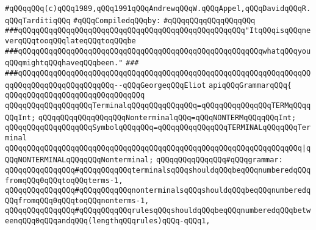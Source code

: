 \label{src/app/yacc/src/grammar.api}
\verb|#qQQqqQQq(c)qQQq1989,qQQq1991qQQqAndrewqQQqW.qQQqAppel,qQQqDavidqQQqR.qQQqTarditiqQQq|\newline
\newline
\verb|#qQQqCompiledqQQqby:|\newline
\verb|#qQQqqQQqqQQqqQQqqQQq|\newline
\newline
\newline
\newline
\verb|###qQQqqQQqqQQqqQQqqQQqqQQqqQQqqQQqqQQqqQQqqQQqqQQqqQQq"ItqQQqisqQQqneverqQQqtooqQQqlateqQQqtoqQQqbe|\newline
\verb|###qQQqqQQqqQQqqQQqqQQqqQQqqQQqqQQqqQQqqQQqqQQqqQQqqQQqqQQqwhatqQQqyouqQQqmightqQQqhaveqQQqbeen."|\newline
\verb|###|\newline
\verb|###qQQqqQQqqQQqqQQqqQQqqQQqqQQqqQQqqQQqqQQqqQQqqQQqqQQqqQQqqQQqqQQqqQQqqQQqqQQqqQQqqQQqqQQqqQQq--qQQqGeorgeqQQqEliot|\newline
\newline
\newline
\newline
\verb|apiqQQqGrammarqQQq{|\newline
\verb|qQQqqQQqqQQqqQQqqQQqqQQqqQQqqQQq|\newline
\verb|qQQqqQQqqQQqqQQqqQQqTerminalqQQqqQQqqQQqqQQq=qQQqqQQqqQQqqQQqTERMqQQqqQQqInt;|\newline
\verb|qQQqqQQqqQQqqQQqqQQqNonterminalqQQq=qQQqNONTERMqQQqqQQqInt;|\newline
\newline
\verb|qQQqqQQqqQQqqQQqqQQqSymbolqQQqqQQq=qQQqqQQqqQQqqQQqTERMINALqQQqqQQqTerminal|\newline
\verb|qQQqqQQqqQQqqQQqqQQqqQQqqQQqqQQqqQQqqQQqqQQqqQQqqQQqqQQqqQQqqQQqqQQq|\verb#|qQQqNONTERMINALqQQqqQQqNonterminal;#\newline
\newline
\verb|qQQqqQQqqQQqqQQq#qQQqgrammar:|\newline
\verb|qQQqqQQqqQQqqQQq#qQQqqQQqqQQqterminalsqQQqshouldqQQqbeqQQqnumberedqQQqfromqQQq0qQQqtoqQQqterms-1,|\newline
\verb|qQQqqQQqqQQqqQQq#qQQqqQQqqQQqnonterminalsqQQqshouldqQQqbeqQQqnumberedqQQqfromqQQq0qQQqtoqQQqnonterms-1,|\newline
\verb|qQQqqQQqqQQqqQQq#qQQqqQQqqQQqrulesqQQqshouldqQQqbeqQQqnumberedqQQqbetweenqQQq0qQQqandqQQq(lengthqQQqrules)qQQq-qQQq1,|\newline
